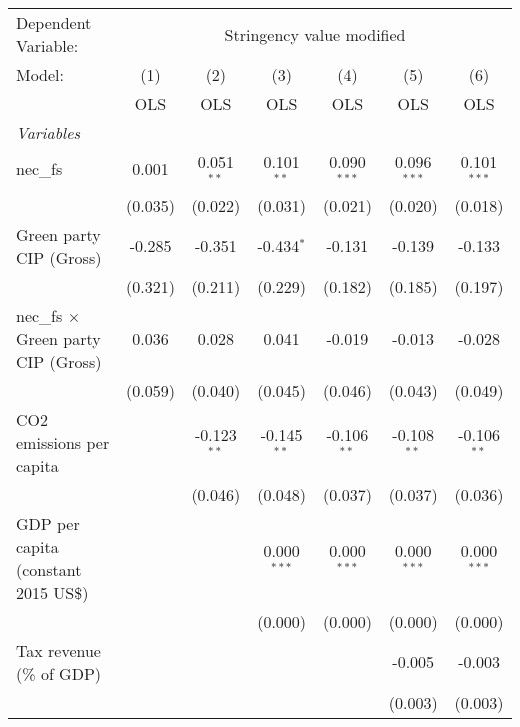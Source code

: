 
\begingroup
\centering
\begin{tabular}{lcccccc}
   \toprule
   Dependent Variable: & \multicolumn{6}{c}{Stringency value modified}\\
   Model:                                     & (1)     & (2)           & (3)           & (4)           & (5)           & (6)\\  
                                              &  OLS    & OLS           & OLS           & OLS           & OLS           & OLS\\  
   \midrule
   \emph{Variables}\\
   nec\_fs                                    & 0.001   & 0.051$^{**}$  & 0.101$^{**}$  & 0.090$^{***}$ & 0.096$^{***}$ & 0.101$^{***}$\\   
                                              & (0.035) & (0.022)       & (0.031)       & (0.021)       & (0.020)       & (0.018)\\   
   Green party CIP (Gross)                    & -0.285  & -0.351        & -0.434$^{*}$  & -0.131        & -0.139        & -0.133\\   
                                              & (0.321) & (0.211)       & (0.229)       & (0.182)       & (0.185)       & (0.197)\\   
   nec\_fs $\times$ Green party CIP (Gross)   & 0.036   & 0.028         & 0.041         & -0.019        & -0.013        & -0.028\\   
                                              & (0.059) & (0.040)       & (0.045)       & (0.046)       & (0.043)       & (0.049)\\   
   CO2 emissions per capita                   &         & -0.123$^{**}$ & -0.145$^{**}$ & -0.106$^{**}$ & -0.108$^{**}$ & -0.106$^{**}$\\   
                                              &         & (0.046)       & (0.048)       & (0.037)       & (0.037)       & (0.036)\\   
   GDP per capita (constant 2015 US\$)        &         &               & 0.000$^{***}$ & 0.000$^{***}$ & 0.000$^{***}$ & 0.000$^{***}$\\   
                                              &         &               & (0.000)       & (0.000)       & (0.000)       & (0.000)\\   
   Tax revenue (\% of GDP)                    &         &               &               &               & -0.005        & -0.003\\   
                                              &         &               &               &               & (0.003)       & (0.003)\\   

\end{tabular}
